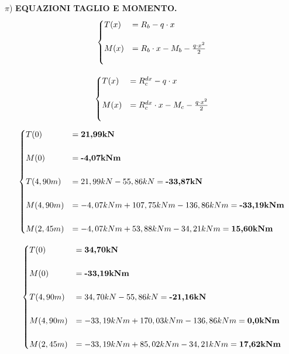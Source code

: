 \documentclass[a4paper,12pt, oneside]{book}
\begin{document}
    \break
    
    $\pi$) \textbf{EQUAZIONI TAGLIO E MOMENTO.}
    \leavevmode\newline
    \leavevmode\newline
    \phantom{testoabcdefgh}{\tiny TRATTO B-C}
    \begin{equation}
    	\begin{cases}
    	T(x)&=R_b-q\cdot x \\ \\
        M(x)&=R_b\cdot x-M_b-\frac{q\cdot x^2}{2}\\ \\ 
    	\end{cases}
    	\hfill
    \end{equation}

    \phantom{testoabcdefgh}{\tiny TRATTO C-D}
    \begin{equation}
    	\begin{cases}
    		T(x)&=R_{c}^{dx}-q\cdot x \\ \\
    		M(x)&=R_{c}^{dx}\cdot x-M_c-\frac{q\cdot x^2}{2}\\ \\ 
    	\end{cases}
    	\hfill
    \end{equation}
    \leavevmode\newline
    \leavevmode\newline
    \leavevmode\newline
    \phantom{tes}{\tiny TRATTO B-C}
    \begin{equation}
    	\begin{cases}
    		T(0)&=\textbf{21,99kN} \\ \\
    		M(0)&=\textbf{-4,07kNm}\\ \\ 
    		T(4,90m)&=21,99kN-55,86kN=\textbf{-33,87kN}\\ \\ 
    		M(4,90m)&=-4,07kNm+107,75kNm-136,86kNm=\textbf{-33,19kNm}\\ \\ 
    		M(2,45m)&=-4,07kNm+53,88kNm-34,21kNm=\textbf{15,60kNm}
    	\end{cases}
    	\hfill
    \end{equation}
    
    \phantom{tes}{\tiny TRATTO C-D}
    \begin{equation}
    	\begin{cases}
    		T(0)&=\textbf{34,70kN} \\ \\
    		M(0)&=\textbf{-33,19kNm}\\ \\ 
    		T(4,90m)&=34,70kN-55,86kN=\textbf{-21,16kN}\\ \\ 
    		M(4,90m)&=-33,19kNm+170,03kNm-136,86kNm=\textbf{0,0kNm}\\ \\ 
    		M(2,45m)&=-33,19kNm+85,02kNm-34,21kNm=\textbf{17,62kNm}
    	\end{cases}
    	\hfill
    \end{equation}
    
\end{document}
